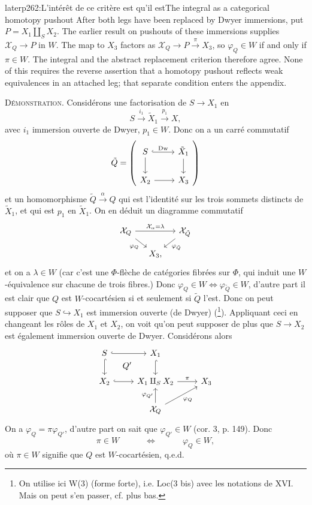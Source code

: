 \begin{dcomment}{later}{p262:L'intérêt de ce critère est qu'il est}{The integral as a categorical homotopy pushout}
After both legs have been replaced by Dwyer immersions, put $P=X_1\amalg_SX_2$. The earlier result on pushouts of these immersions supplies $\mathcal X_Q\to P$ in $W$. The map to $X_3$ factors as $\mathcal X_Q\to P\xrightarrow{\pi}X_3$, so $\varphi_Q\in W$ if and only if $\pi\in W$. The integral and the abstract replacement criterion therefore agree. None of this requires the reverse assertion that a homotopy pushout reflects weak equivalences in an attached leg; that separate condition enters the appendix.
\end{dcomment}


\textsc{Démonstration.} Considérons une factorisation de $S \longrightarrow X_1$ en
\[
S \xrightarrow{i_1} \tilde{X}_1 \xrightarrow{p_1} X, %
\]
avec $i_1$ immersion ouverte de Dwyer, $p_1 \in W$. Donc on a un carré commutatif
\[
\tilde{Q} = \left(
\begin{tikzcd}[ampersand replacement=\&]
S \arrow[r, hook, "\mathrm{Dw}"] \arrow[d] \& \tilde{X}_1 \arrow[d] \\
X_2 \arrow[r] \& X_3
\end{tikzcd}
\right)
\]
et un homomorphisme $\tilde{Q} \xrightarrow{\alpha} Q$ qui est l'identité sur les trois sommets distincts de $\tilde{X}_1$, et qui est $p_1$ en $\tilde{X}_1$. On en déduit un diagramme commutatif
\[
\begin{tikzcd}[ampersand replacement=\&, row sep=small, column sep=small]
\mathcal{X}_Q \arrow[rr, "\mathcal{X}_\alpha = \lambda"] \arrow[dr, "\varphi_Q"'] \& \& \mathcal{X}_{\tilde{Q}} \arrow[dl, "\varphi_{\tilde{Q}}"] \\
 \& X_3, \&
\end{tikzcd}
\]
et on a $\lambda \in W$ (car c'est une $\Phi$-flèche de catégories fibrées sur $\Phi$, qui induit une $W$-équivalence sur chacune de trois fibres.) Donc $\varphi_Q \in W \iff \varphi_{\tilde{Q}} \in W$, d'autre part il est clair que $Q$ est $W$-cocartésien si et seulement si $\tilde{Q}$ l'est. Donc on peut supposer que $S \hookrightarrow X_1$ est immersion ouverte (de Dwyer) (\footnote[134]{On utilise ici W(3) (forme forte), i.e. Loc(3 bis) avec les notations de XVI. Mais on peut s'en passer, cf. plus bas.}). Appliquant ceci
en changeant les rôles de $X_1$ et $X_2$, on voit qu'on peut supposer de plus que $S \longrightarrow X_2$ est également immersion ouverte de Dwyer. Considérons alors
\[
\begin{tikzcd}[ampersand replacement=\&]
S \arrow[r, hook] \arrow[d, hook] \arrow[dr, phantom, "Q'"] \& X_1 \arrow[d, hook] \& \\
X_2 \arrow[r, hook] \& X_1 \amalg_S X_2 \arrow[r, "\pi"] \& X_3 \\
 \& \mathcal{X}_Q \arrow[u, "\varphi_{Q'}"] \arrow[ur, "\varphi_Q"'] \&
\end{tikzcd}
\]
On a $\varphi_Q = \pi\varphi_{Q'}$, d'autre part on sait que $\varphi_{Q'} \in W$ (cor. 3, p. 149). Donc
\[
\pi \in W \qquad\quad \iff \qquad\quad \varphi_Q \in W,
\]
où $\pi \in W$ signifie que $Q$ est $W$-cocartésien, q.e.d.

